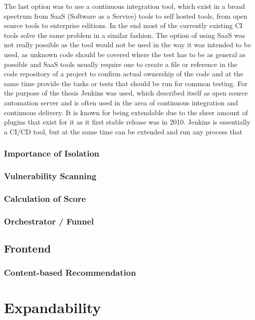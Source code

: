The last option was to use a continuous integration tool, which exist in a broad spectrum from SaaS (Software as a Service) tools to self hosted tools, from open source tools to enterprise editions. In the end most of the currently existing CI tools solve the same problem in a similar fashion. The option of using SaaS was not really possible as the tool would not be used in the way it was intended to be used, as unknown code should be covered where the test has to be as general as possible and SaaS tools usually require one to create a file or reference in the code repository of a project to confirm actual ownership of the code and at the same time provide the tasks or tests that should be run for common testing.
For the purpose of the thesis Jenkins was used, which described itself as open source automation server and is often used in the area of continuous integration and continuous delivery. It is known for being extendable due to the sheer amount of plugins that exist for it as it first stable release was in 2010. Jenkins is essentially a CI/CD tool, but at the same time can be extended and run any process that


\subsubsection{Importance of Isolation}
\subsubsection{Vulnerability Scanning}
\subsubsection{Calculation of Score}
\subsubsection{Orchestrator / Funnel}
\subsection{Frontend}
\subsubsection{Content-based Recommendation}
\section{Expandability}
